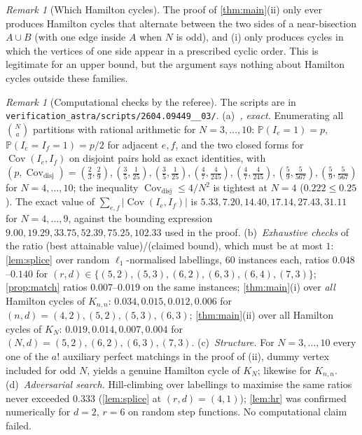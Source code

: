 \documentclass[11pt,a4paper]{article}
\theoremstyle{plain}
\theoremstyle{definition}
\theoremstyle{remark}
\newtheorem{remark}[theorem]{Remark}
\newcommand{\Prob}{\mathbb P}
\newcommand{\Cov}{\operatorname{Cov}}
\begin{document}
\begin{remark}[Which Hamilton cycles]\label{rem:family}
The proof of \cref{thm:main}(ii) only ever produces Hamilton cycles that alternate between the two sides of a near-bisection $A\cup B$ (with one edge inside $A$ when $N$ is odd), and (i) only produces cycles in which the vertices of one side appear in a prescribed cyclic order. This is legitimate for an upper bound, but the argument says nothing about Hamilton cycles outside these families.
\end{remark}

\begin{remark}[Computational checks by the referee]\label{rem:comp}
The scripts are in \nolinkurl{verification_astra/scripts/2604.09449__03/}. (a)~\emph{, exact.} Enumerating all $\binom Na$ partitions with rational arithmetic for $N=3,\dots,10$: $\Prob(I_e=1)=p$, $\Prob(I_e=I_f=1)=p/2$ for adjacent $e,f$, and the two closed forms for $\Cov(I_e,I_f)$ on disjoint pairs hold as exact identities, with $(p,\Cov_{\text{disj}})=(\frac23,\frac29),\allowbreak (\frac35,\frac1{25}),\allowbreak (\frac35,\frac1{25}),\allowbreak (\frac47,\frac4{245}),\allowbreak (\frac47,\frac4{245}),\allowbreak (\frac59,\frac5{567}),\allowbreak (\frac59,\frac5{567})$ for $N=4,\dots,10$; the inequality $\Cov_{\text{disj}}\le4/N^2$ is tightest at $N=4$ ($0.222\le0.25$). The exact value of $\sum_{e,f}|\Cov(I_e,I_f)|$ is $5.33,7.20,14.40,17.14,27.43,31.11$ for $N=4,\dots,9$, against the bounding expression $9.00,19.29,33.75,52.39,75.25,102.33$ used in the proof. (b)~\emph{Exhaustive checks} of the ratio (best attainable value)/(claimed bound), which must be at most $1$: \cref{lem:splice} over random $\ell_1$-normalised labellings, $60$ instances each, ratios $0.048$--$0.140$ for $(r,d)\in\{(5,2),\allowbreak (5,3),\allowbreak (6,2),\allowbreak (6,3),\allowbreak (6,4),\allowbreak (7,3)\}$; \cref{prop:match} ratios $0.007$--$0.019$ on the same instances; \cref{thm:main}(i) over \emph{all} Hamilton cycles of $K_{n,n}$: $0.034,0.015,0.012,0.006$ for $(n,d)=(4,2),\allowbreak (5,2),\allowbreak (5,3),\allowbreak (6,3)$; \cref{thm:main}(ii) over all Hamilton cycles of $K_N$: $0.019,0.014,0.007,0.004$ for $(N,d)=(5,2),\allowbreak (6,2),\allowbreak (6,3),\allowbreak (7,3)$. (c)~\emph{Structure.} For $N=3,\dots,10$ every one of the $a!$ auxiliary perfect matchings in the proof of (ii), dummy vertex included for odd $N$, yields a genuine Hamilton cycle of $K_N$; likewise for $K_{n,n}$. (d)~\emph{Adversarial search.} Hill-climbing over labellings to maximise the same ratios never exceeded $0.333$ (\cref{lem:splice} at $(r,d)=(4,1)$); \cref{lem:hr} was confirmed numerically for $d=2$, $r=6$ on random step functions. No computational claim failed.
\end{remark}
\end{document}
